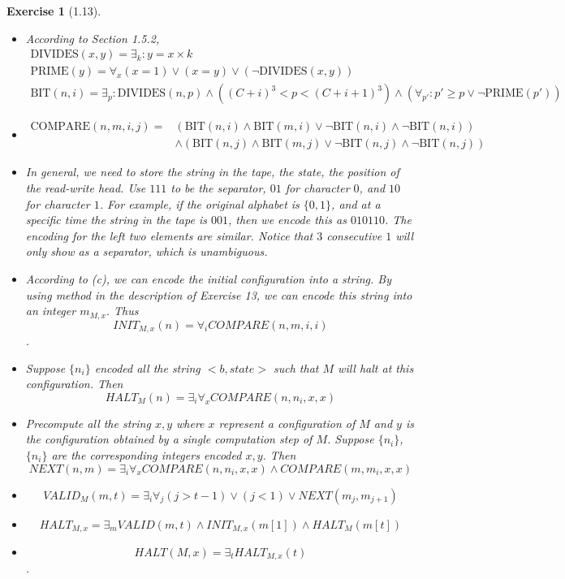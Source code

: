 \documentclass[a4paper]{article}
\newtheorem*{exercise}{Exercise}
\newcommand{\bin}{\{0,1\}}
\begin{document}
\begin{exercise}[1.13]
	\begin{itemize}
		\item[(a)] According to Section 1.5.2, 
            \begin{gather*}
                \text{DIVIDES}(x,y)=\exists_k: y=x\times k\\
                \text{PRIME}(y)=\forall_x (x=1)\vee(x=y)\vee(\neg\text{DIVIDES}(x,y))\\
                \text{BIT}(n,i)=\exists_p: \text{DIVIDES}(n,p)\wedge ((C+i)^3<p<(C+i+1)^3) 
                \wedge (\forall_{p'}: p'\geq p\vee\neg\text{PRIME}(p'))
            \end{gather*}

		\item[(b)] 
            \begin{align*}
                \text{COMPARE}(n,m,i,j)=&(\text{BIT}(n,i)\wedge\text{BIT}(m,i)\vee\neg\text{BIT}(n,i)\wedge\neg\text{BIT}(n,i))\\
                &\wedge(\text{BIT}(n,j)\wedge\text{BIT}(m,j)\vee\neg\text{BIT}(n,j)\wedge\neg\text{BIT}(n,j))
            \end{align*}
	    \item[(c)] In general, we need to store the string in the tape, the state,
            the position of the read-write head. 
            Use $111$ to be the separator, $01$ for character $0$, and $10$ for character $1$. 
            For example, if the original alphabet is $\bin$, and at a specific time the string in the tape is $001$, 
            then we encode this as $010110$. The encoding for the left two elements are similar. 
            Notice that $3$ consecutive $1$ will only show as a separator, which is unambiguous.

\item[(d)] According to (c), we can encode the initial configuration into a string. By using method in the description of Exercise 13, we can encode this string into an integer $m_{M,x}$. Thus 
$$INIT_{M,x}(n)=\forall_i COMPARE(n,m,i,i)$$.
\item[(e)] Suppose $\{n_i\}$ encoded all the string $<b,state>$ such that $M$ will halt at this configuration. Then 
$$
HALT_M(n)=\exists_i \forall_x COMPARE(n,n_i,x,x)
$$   
\item[(f)] Precompute all the string $x,y$ where $x$ represent a configuration of $M$ and $y$ is the configuration obtained by a single computation step of $M$. Suppose $\{n_i\}$,$\{n_i\}$ are the corresponding integers encoded $x,y$.
Then 
$$
NEXT(n,m)=\exists_i\forall_x COMPARE(n,n_i,x,x)\wedge COMPARE(m,m_i,x,x)
$$
\item[(g)] 
$$
VALID_M(m,t)=\exists_i\forall_j (j>t-1)\vee(j<1)\vee NEXT(m_j,m_{j+1})
$$
\item[(h)] 
$$
HALT_{M,x}=\exists_m VALID(m,t)\wedge INIT_{M,x}(m[1])\wedge HALT_M(m[t])
$$
\item[(i)] 
$$HALT(M,x)=\exists_t HALT_{M,x}(t)$$.

	\end{itemize}
\end{exercise}
\end{document}
